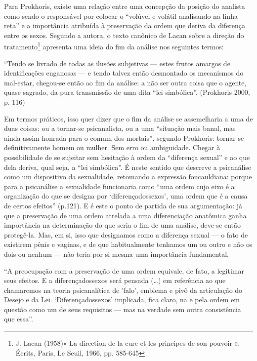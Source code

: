 Para Prokhoris, existe uma relação entre uma concepção da posição do
analista como sendo o responsável por colocar o ``volúvel e volátil
analisando na linha reta'' e a importância atribuída à preservação da
ordem que deriva da diferença entre os sexos. Segundo a autora, o texto
canônico de Lacan sobre a direção do tratamento\footnote{J. Lacan
  (1958)« La direction de la cure et les principes de son pouvoir »,
  Écrits, Paris, Le Seuil, 1966, pp. 585-645} apresenta uma ideia do fim
da análise nos seguintes termos:

``Tendo se livrado de todas as ilusões subjetivas --- estes frutos
amargos de identificações enganosas --- e tendo talvez então desmontado
os mecanismos do mal-estar, chegou-se então ao fim da análise: a não
ser outra coisa que o agente, quase sagrado, da pura transmissão de uma
dita ``lei simbólica''. (Prokhoris 2000, p. 116)

Em termos práticos, isso quer dizer que o fim da análise se assemelharia
a uma de duas coisas: ou a tornar-se psicanalista, ou a uma ``situação
mais banal, mas ainda assim honrada para o comum dos mortais'', segundo
Prokhoris: tornar-se definitivamente homem ou mulher. Sem erro ou
ambiguidade. Chegar à possibilidade de se sujeitar sem hesitação à ordem
da ``diferença sexual'' e ao que dela deriva, qual seja, a ``lei
simbólica''. É neste sentido que descreve a psicanálise como um
dispositivo da sexualidade, retomando a expressão foucauldiana: porque
para a psicanálise a sexualidade funcionaria como ``uma ordem cujo eixo
é a organização do que se designa por `diferençadossexos', uma ordem
que é a causa de certos efeitos'' (p.121). E é este o ponto de partida
de sua argumentação: já que a preservação de uma ordem atrelada a uma
diferenciação anatômica ganha importância na determinação do que seria o
fim de uma análise, deve-se então protegê-la. Mas, em si, isso que
designamos como a diferença sexual --- o fato de existirem pênis e
vaginas, e de que habitualmente tenhamos um ou outro e não os dois ou
nenhum --- não teria por si mesma uma importância fundamental.

``A preocupação com a preservação de uma ordem equivale, de fato, a
legitimar seus efeitos. E a diferençadossexos será pensada (\ldots{})
em referência ao que chamaremos na teoria psicanalítica de 'falo',
emblema e pivô da articulação do Desejo e da Lei. `Diferençadossexos'
implicada, fica claro, na e pela ordem em questão como um de seus
requisitos --- mas na verdade sem outra consistência que essa''.


